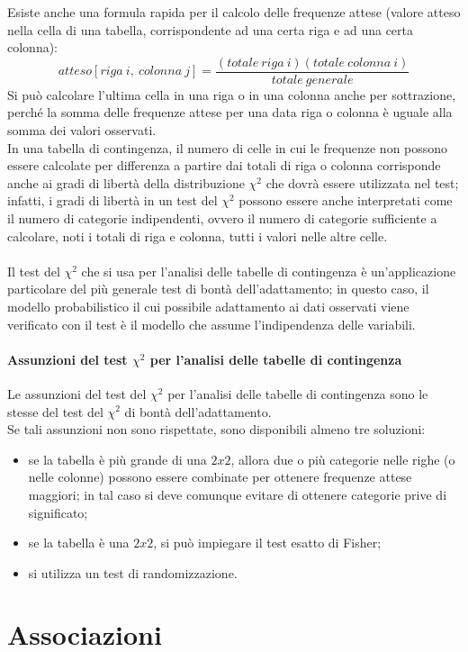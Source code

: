 \documentclass[drafts, 10pt]{book}
\begin{document}
Esiste anche una formula rapida per il calcolo delle frequenze attese (valore atteso nella cella di una tabella, corrispondente ad una certa riga e ad una certa colonna):
\begin{equation}
    atteso[riga\ i,\ colonna\ j] = \frac{(totale\ riga\ i)(totale\ colonna\ i)}{totale\ generale}
\end{equation}
Si può calcolare l'ultima cella in una riga o in una colonna anche per sottrazione, perché la somma delle frequenze attese per una data riga o colonna è uguale alla somma dei valori osservati.
\\
In una tabella di contingenza, il numero di celle in cui le frequenze non possono essere calcolate per differenza a partire dai totali di riga o colonna corrisponde anche ai gradi di libertà della distribuzione $\chi^2$ che dovrà essere utilizzata nel test; infatti, i gradi di libertà in un test del $\chi^2$ possono essere anche interpretati come il numero di categorie indipendenti, ovvero il numero di categorie sufficiente a calcolare, noti i totali di riga e colonna, tutti i valori nelle altre celle.
\\
\\
Il test del $\chi^2$ che si usa per l'analisi delle tabelle di contingenza è un'applicazione particolare del più generale test di bontà dell'adattamento; in questo caso, il modello probabilistico il cui possibile adattamento ai dati osservati viene verificato con il test è il modello che assume l'indipendenza delle variabili.

\subsection{Assunzioni del test \texorpdfstring{$\chi^2$}{Lg} per l'analisi delle tabelle di contingenza}
Le assunzioni del test del $\chi^2$ per l'analisi delle tabelle di contingenza sono le stesse del test del $\chi^2$ di bontà dell'adattamento.
\\
Se tali assunzioni non sono rispettate, sono disponibili almeno tre soluzioni:
\begin{itemize}
    \item se la tabella è più grande di una $2x2$, allora due o più categorie nelle righe (o nelle colonne) possono essere combinate per ottenere frequenze attese maggiori; in tal caso si deve comunque evitare di ottenere categorie prive di significato;
    \item se la tabella è una $2x2$, si può impiegare il test esatto di Fisher; %
    \item si utilizza un test di randomizzazione. %
\end{itemize}

\part{Associazioni}

\chapter{}

\section{}
\end{document}
